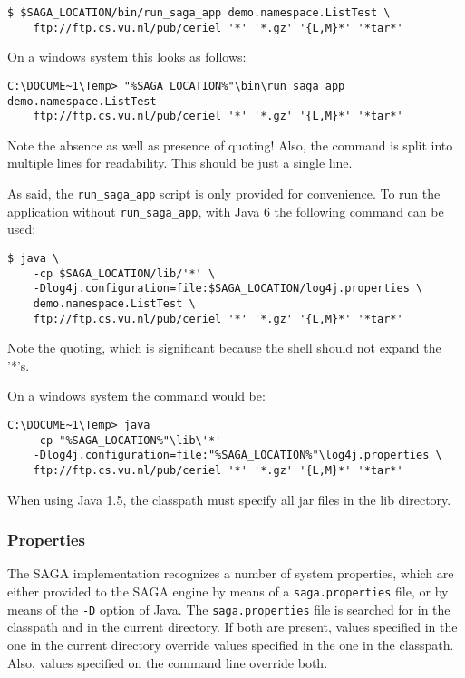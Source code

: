 \documentclass[a4paper,10pt]{article}
\begin{document}
\noindent
{\small
\begin{verbatim}
$ $SAGA_LOCATION/bin/run_saga_app demo.namespace.ListTest \
    ftp://ftp.cs.vu.nl/pub/ceriel '*' '*.gz' '{L,M}*' '*tar*'
\end{verbatim}
}
\noindent

On a windows system this looks as follows:

\noindent
{\small
\begin{verbatim}
C:\DOCUME~1\Temp> "%SAGA_LOCATION%"\bin\run_saga_app demo.namespace.ListTest
    ftp://ftp.cs.vu.nl/pub/ceriel '*' '*.gz' '{L,M}*' '*tar*'
\end{verbatim}
}
\noindent

Note the absence as well as presence of quoting! Also, the
command is split into multiple lines for readability.
This should be just a single line.

As said, the \texttt{run\_saga\_app} script is only provided for convenience.
To run the application without \texttt{run\_saga\_app},
with Java 6 the following command can be used:

\noindent
{\small
\begin{verbatim}
$ java \
    -cp $SAGA_LOCATION/lib/'*' \
    -Dlog4j.configuration=file:$SAGA_LOCATION/log4j.properties \
    demo.namespace.ListTest \
    ftp://ftp.cs.vu.nl/pub/ceriel '*' '*.gz' '{L,M}*' '*tar*'
\end{verbatim}
}
\noindent

Note the quoting, which is significant because the shell should not expand
the '*'s.

On a windows system the command would be:

\noindent
{\small
\begin{verbatim}
C:\DOCUME~1\Temp> java
    -cp "%SAGA_LOCATION%"\lib\'*'
    -Dlog4j.configuration=file:"%SAGA_LOCATION%"\log4j.properties \
    ftp://ftp.cs.vu.nl/pub/ceriel '*' '*.gz' '{L,M}*' '*tar*'
\end{verbatim}
}
\noindent

When using Java 1.5, the classpath must specify all jar files in the lib
directory.

\subsubsection{Properties}

The SAGA implementation recognizes a number of system properties, which
are either provided to the SAGA engine by means of a \texttt{saga.properties}
file, or by means of the \texttt{-D} option of Java.
The \texttt{saga.properties} file is searched for in the classpath and in
the current directory. If both are present, values specified in the one
in the current directory override values specified in the one in the
classpath. Also, values specified on the command line override both.
\end{document}
